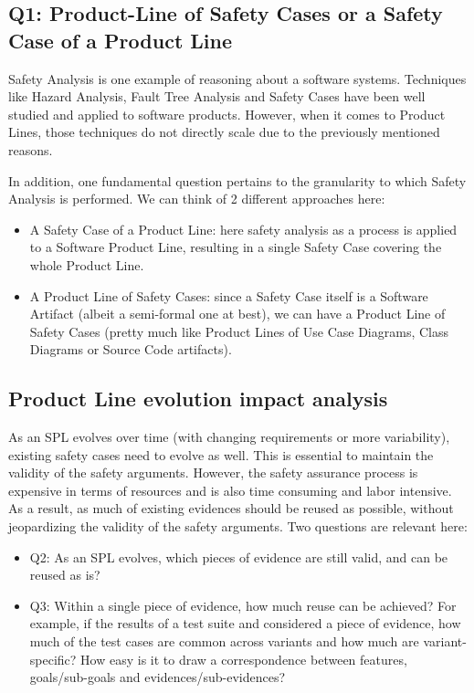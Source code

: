 \documentclass[11pt]{article}
\begin{document}
\subsection{Q1: Product-Line of Safety Cases or a Safety Case of a Product Line}

Safety Analysis is one example of reasoning about a software systems. Techniques like Hazard Analysis, Fault Tree Analysis and Safety Cases have been well studied and applied to software products. However, when it comes to Product Lines, those techniques do not directly scale due to the previously mentioned reasons. 

In addition, one fundamental question pertains to the granularity to which Safety Analysis is performed. We can think of 2 different approaches here:

\begin{itemize}

\item A Safety Case of a Product Line: here safety analysis as a process is applied to a Software Product Line, resulting in a single Safety Case covering the whole Product Line.

\item A Product Line of Safety Cases: since a Safety Case itself is a Software Artifact (albeit a semi-formal one at best), we can have a Product Line of Safety Cases (pretty much like Product Lines of Use Case Diagrams, Class Diagrams or Source Code artifacts). 

\end{itemize}

\subsection{Product Line evolution impact analysis}

As an SPL evolves over time (with changing requirements or more variability), existing safety cases need to evolve as well. This is essential to maintain the validity of the safety arguments. However, the safety assurance process is expensive in terms of resources and is also time consuming and labor intensive. As a result, as much of existing evidences should be reused as possible, without jeopardizing the validity of the safety arguments. Two questions are relevant here:

\begin{itemize}

\item Q2: As an SPL evolves, which pieces of evidence are still valid, and can be reused as is?

\item Q3: Within a single piece of evidence, how much reuse can be achieved? For example, if the results of a test suite and considered a piece of evidence, how much of the test cases are common across variants and how much are variant-specific? How easy is it to draw a correspondence between features, goals/sub-goals and evidences/sub-evidences? 

\end{itemize}



\end{document}
